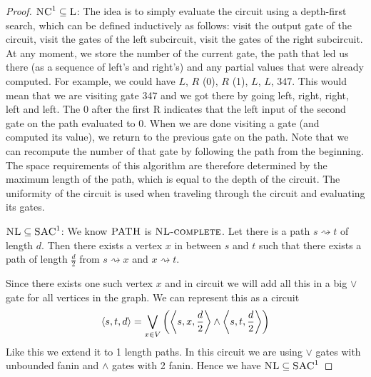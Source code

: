 \begin{proof}
	$\textsc{NC}^1\subseteq \textsc{L}$: The idea is to simply evaluate the circuit using a depth-first search, which can be defined inductively as follows: visit the output gate of the circuit, visit the gates of the left subcircuit, visit the gates of the right subcircuit. At any moment, we store the number of the current gate, the path that led us there (as a sequence of left’s and right’s) and any partial values that were already computed. For example, we could have $L$, $R$ (0), $R$ (1), $L$, $L$, 347. This would mean that we are visiting gate 347 and we got there by going left, right, right, left and left. The 0 after the first R indicates that the left input of the second gate on the path evaluated to 0. When we are done visiting a gate (and computed its value), we return to the previous gate on the path. Note that we can recompute the number of that gate by following the path from the beginning. The space requirements of this algorithm are therefore determined by the maximum length of the path, which is equal to the depth of the circuit. The uniformity of the circuit is used when traveling through the circuit and evaluating its gates. 
	
	$\textsc{NL}\subseteq \textsc{SAC}^1$: We know $\textsc{PATH}$ is $\textsc{NL-complete}$. Let there is a path $s\rightsquigarrow t$  of length $d$. Then there exists a vertex $x$ in between $s$ and $t$ such that there exists a path of length $\frac{d}{2}$ from $s\rightsquigarrow x$ and $x\rightsquigarrow t$. 
	\begin{center}
	\end{center}
	Since there exists one such vertex $x$ and in circuit we will add all this in a big $\vee$ gate for all vertices in the graph. We can represent this as a circuit$$\left\langle s,t,d\right\rangle=\bigvee_{x\in V}\left(\left\langle s,x,\frac{d}{2}\right\rangle \wedge \left\langle s,t,\frac{d}{2}\right\rangle\right)$$Like this we extend it to 1 length paths. In this circuit we are using $\vee$ gates with unbounded fanin and $\wedge$ gates with 2 fanin. Hence we have $\textsc{NL}\subseteq \textsc{SAC}^1$
\end{proof}